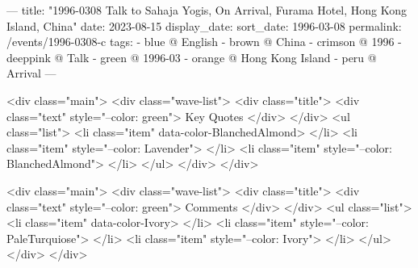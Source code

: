 ---
title: "1996-0308 Talk to Sahaja Yogis, On Arrival, Furama Hotel, Hong Kong Island, China"
date: 2023-08-15
display_date: 
sort_date: 1996-03-08
permalink: /events/1996-0308-c
tags:
  - blue @ English
  - brown @ China
  - crimson @ 1996
  - deeppink @ Talk
  - green @ 1996-03
  - orange @ Hong Kong Island
  - peru @ Arrival
---

<div class="main">
  <div class="wave-list">
    <div class="title">
      <div class="text" style="--color: green">
        Key Quotes
      </div>
    </div>
    <ul class="list">
        <li class="item" data-color-BlanchedAlmond>
        </li>
        <li class="item" style="--color: Lavender">
        </li>
        <li class="item" style="--color: BlanchedAlmond">
        </li>
      </ul>
  </div>
</div>

<div class="main">
  <div class="wave-list">
    <div class="title">
      <div class="text" style="--color: green">
        Comments
      </div>
    </div>
    <ul class="list">
        <li class="item" data-color-Ivory>
        </li>
        <li class="item" style="--color: PaleTurquiose">
        </li>
        <li class="item" style="--color: Ivory">
        </li>
      </ul>
  </div>
</div>